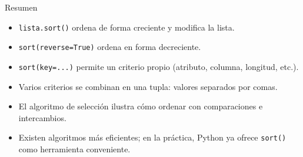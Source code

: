 \documentclass{beamer}
\begin{document}
    \begin{frame}{Resumen}
        \begin{itemize}
            \item \texttt{lista.sort()} ordena de forma creciente y modifica la lista.
            \pause
            \item \texttt{sort(reverse=True)} ordena en forma decreciente.
            \pause
            \item \texttt{sort(key=...)} permite un criterio propio
            (atributo, columna, longitud, etc.).
            \pause
            \item Varios criterios se combinan en una tupla: valores separados por comas.
            \pause
            \item El algoritmo de selección ilustra cómo ordenar con comparaciones
            e intercambios.
            \pause
            \item Existen algoritmos más eficientes; en la práctica, Python ya ofrece
            \texttt{sort()} como herramienta conveniente.
        \end{itemize}
    \end{frame}
\end{document}
